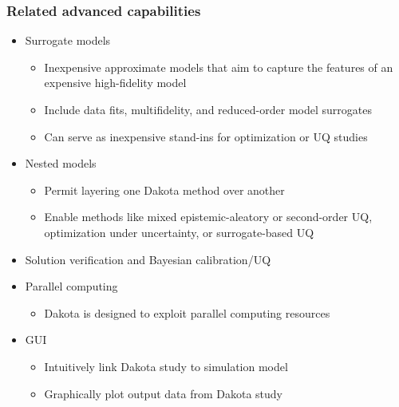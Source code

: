 \documentclass[t]{beamer}
\begin{document}

\begin{frame}
  \frametitle{Related advanced capabilities}
  \begin{itemize}
    \item Surrogate models
    \begin{itemize}
      \item Inexpensive approximate models that aim to capture the features of
            an expensive high-fidelity model
      \item Include data fits, multifidelity, and reduced-order model surrogates
      \item Can serve as inexpensive stand-ins for optimization or UQ studies
    \end{itemize}
    \item Nested models
    \begin{itemize}
      \item Permit layering one Dakota method over another
      \item Enable methods like mixed epistemic-aleatory or second-order UQ,
            optimization under uncertainty, or surrogate-based UQ
    \end{itemize}
    \item Solution verification and Bayesian calibration/UQ
    \item Parallel computing
    \begin{itemize}
      \item Dakota is designed to exploit parallel computing resources
    \end{itemize}
    \item GUI
    \begin{itemize}
      \item Intuitively link Dakota study to simulation model
      \item Graphically plot output data from Dakota study
    \end{itemize}
  \end{itemize}
\end{frame}

\end{document}
